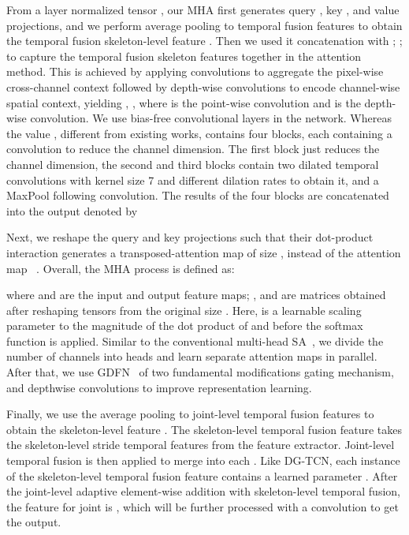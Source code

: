 \documentclass{bmvc2k}
\begin{document}
From a layer normalized tensor , our MHA first generates query , key , and value  projections, and we perform average pooling to  temporal fusion features  to obtain the temporal fusion skeleton-level feature .
Then we used it  concatenation with ; ;  to capture the temporal fusion skeleton features together in the attention method.
This is achieved by applying  convolutions to aggregate the pixel-wise cross-channel context followed by  depth-wise convolutions to encode channel-wise spatial context, yielding , , where  is the  point-wise convolution and  is the  depth-wise convolution. We use bias-free convolutional layers in the network. Whereas the value , different from existing works, contains four blocks, each containing a  convolution to reduce the channel dimension. The first block just reduces the channel dimension, the second and third blocks contain two dilated temporal convolutions with kernel size 7 and different dilation rates  to obtain it, and a MaxPool following  convolution. The results of the four blocks are concatenated into the output denoted by 






Next, we reshape the query and key projections such that their dot-product interaction generates a transposed-attention map  of size , instead of the attention map ~\cite{Alexey-17,Ashish-2017}.
Overall, the MHA process is defined as:

where  and  are the input and output feature maps; , and  are matrices obtained after reshaping tensors from the original size . Here,  is a learnable scaling parameter to the magnitude of the dot product of  and  before the softmax function is applied.
Similar to the conventional multi-head SA~\cite{Alexey-17}, we divide the number of channels into heads and learn separate attention maps in parallel.
After that, we use GDFN~\cite{Syed-2022} of two fundamental modifications gating mechanism, and depthwise convolutions to improve representation learning.

Finally, we use the average pooling to joint-level temporal fusion features  to obtain the skeleton-level feature .
The skeleton-level temporal fusion feature takes the skeleton-level stride temporal features from the feature extractor.
Joint-level temporal fusion is then applied to merge  into each .
Like DG-TCN, each instance of the skeleton-level temporal fusion feature contains a learned parameter .
After the joint-level adaptive element-wise addition with skeleton-level temporal fusion, the feature for joint  is , which will be further processed with a  convolution to get the output.
\end{document}
